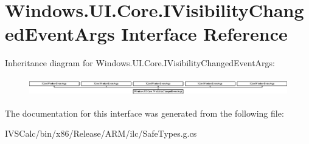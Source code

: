 \hypertarget{interface_windows_1_1_u_i_1_1_core_1_1_i_visibility_changed_event_args}{}\section{Windows.\+U\+I.\+Core.\+I\+Visibility\+Changed\+Event\+Args Interface Reference}
\label{interface_windows_1_1_u_i_1_1_core_1_1_i_visibility_changed_event_args}
Inheritance diagram for Windows.\+U\+I.\+Core.\+I\+Visibility\+Changed\+Event\+Args\+:\begin{figure}[H]
\begin{center}
\leavevmode
\includegraphics[height=0.797153cm]{interface_windows_1_1_u_i_1_1_core_1_1_i_visibility_changed_event_args}
\end{center}
\end{figure}


The documentation for this interface was generated from the following file\+:\begin{DoxyCompactItemize}
\item 
I\+V\+S\+Calc/bin/x86/\+Release/\+A\+R\+M/ilc/Safe\+Types.\+g.\+cs\end{DoxyCompactItemize}
